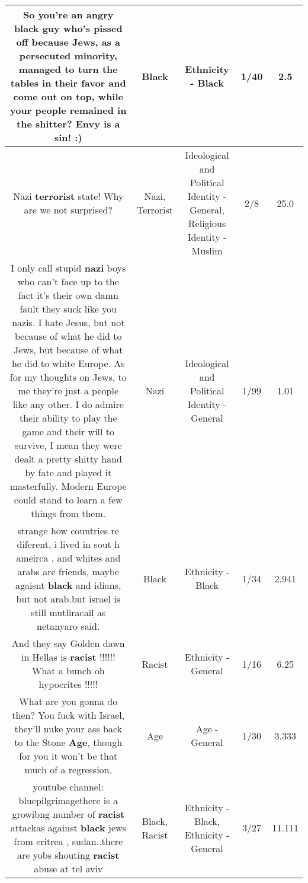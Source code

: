 \documentclass[11pt]{article}
\newlength\mylength
\begin{document}
\begin{center}
\begin{longtable}{|C{.65\mylength}|C{.30\mylength}|C{.12\mylength}|C{.12\mylength}|C{.12\mylength}|}
  \small So you're an angry \textbf{black} guy who's pissed off because Jews, as a persecuted minority, managed to turn the tables in their favor and come out on top, while your people remained in the shitter? Envy is a sin! :)\normalsize   & Black & Ethnicity - Black & 1/40 & 2.5 \\  \hline
  \small Nazi \textbf{terrorist} state! Why are we not surprised?\normalsize   & Nazi, Terrorist &  Ideological and Political Identity - General, Religious Identity - Muslim & 2/8 & 25.0 \\  \hline
  \small I only call stupid \textbf{nazi} boys who can't face up to the fact it's their own damn fault they suck like you nazis. I hate Jesus, but not because of what he did to Jews, but because of what he did to white Europe. As for my thoughts on Jews, to me they're just a people like any other. I do admire their ability to play the game and their will to survive, I mean they were dealt a pretty shitty hand by fate and played it masterfully. Modern Europe could stand to learn a few things from them.\normalsize   & Nazi &  Ideological and Political Identity - General & 1/99 & 1.01 \\  \hline
  \small strange how countries re diferent, i lived in sout h ameirca , and whites and arabs are friends,  maybe agaisnt \textbf{black} and idians,   but not arab.but israel is still mutliracail as netanyaro said.\normalsize   & Black & Ethnicity - Black & 1/34 & 2.941 \\  \hline
  \small And they say Golden dawn in Hellas is \textbf{racist} !!!!!! What a bunch oh hypocrites !!!!!\normalsize   & Racist & Ethnicity - General & 1/16 & 6.25 \\  \hline
  \small What are you gonna do then? You fuck with Israel, they'll nuke your ass back to the Stone \textbf{Age}, though for you it won't be that much of a regression.\normalsize   & Age & Age - General & 1/30 & 3.333 \\  \hline
  \small youtube channel: bluepilgrimagethere is a growibng number of \textbf{racist} attackas against \textbf{black} jews from eritrea , sudan..there are yobs shouting \textbf{racist} abuse at tel aviv\normalsize   & Black, Racist & Ethnicity - Black, Ethnicity - General & 3/27 & 11.111 \\  \hline

\end{longtable}
\end{center}
\end{document}
